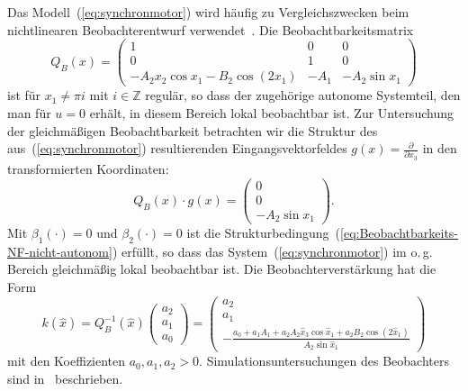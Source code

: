 \begin{example}
Das Modell~(\ref{eq:synchronmotor}) wird häufig zu Vergleichszwecken
beim nichtlinearen Beobachterentwurf verwendet~\cite{keller86diss,birk88,adjallah94,roebenack2003buch,roebenack2005habil,adamy2014,franke2016pamm}.
Die Beobachtbarkeitsmatrix 
\begin{equation}
Q_{B}(x)=\left(\begin{array}{ccc}
1 & 0 & 0\\
0 & 1 & 0\\
-A_{2}x_{2}\cos x_{1}-B_{2}\cos(2x_{1}) & -A_{1} & -A_{2}\sin x_{1}
\end{array}\right)\label{eq:synchronmotor-beobachtbarkeitsmatrix}
\end{equation}
ist für $x_{1}\neq\pi i$ mit $i\in\mathbb{Z}$ regulär, so dass der
zugehörige autonome Systemteil, den man für $u=0$ erhält, in diesem
Bereich lokal beobachtbar ist. Zur Untersuchung der gleichmäßigen
Beobachtbarkeit betrachten wir die Struktur des aus~(\ref{eq:synchronmotor})
resultierenden Eingangsvektorfeldes $g(x)=\tfrac{\partial}{\partial x_{3}}$
in den transformierten Koordinaten:
\[
Q_{B}(x)\cdot g(x)=\left(\begin{array}{c}
0\\
0\\
-A_{2}\sin x_{1}
\end{array}\right).
\]
Mit $\beta_{1}(\cdot)=0$ und $\beta_{2}(\cdot)=0$ ist die Strukturbedingung~(\ref{eq:Beobachtbarkeits-NF-nicht-autonom})
erfüllt, so dass das System~(\ref{eq:synchronmotor}) im o.\,g.
Bereich gleichmäßig lokal beobachtbar ist. Die Beobachterverstärkung
hat die Form
\[
k(\hat{x})=Q_{B}^{-1}(\hat{x})\left(\begin{array}{c}
a_{2}\\
a_{1}\\
a_{0}
\end{array}\right)=\left(\begin{array}{c}
a_{2}\\
a_{1}\\
-\frac{a_{0}+a_{1}A_{1}+a_{2}A_{2}\hat{x}_{3}\cos\hat{x}_{1}+a_{2}B_{2}\cos(2\hat{x}_{1})}{A_{2}\sin\hat{x}_{1}}
\end{array}\right)
\]
mit den Koeffizienten $a_{0},a_{1},a_{2}>0$. Simulationsuntersuchungen
des Beobachters sind in~\cite{roebenack2003buch} beschrieben.
\end{example}

